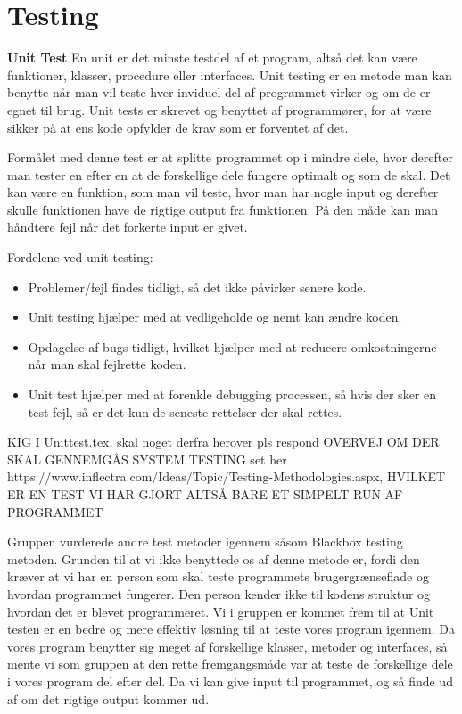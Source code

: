 \section{Testing}\label{Testing}

\textbf{Unit Test} \newline
En unit er det minste testdel af et program, altså det kan være funktioner, klasser, procedure eller interfaces. Unit testing er en metode man kan benytte når man vil teste hver inviduel del af programmet virker og om de er egnet til brug. Unit tests er skrevet og benyttet af programmører, for at være sikker på at ens kode opfylder de krav som er forventet af det. 

\vspace {5mm}

Formålet med denne test er at splitte programmet op i mindre dele, hvor derefter man tester en efter en at de forskellige dele fungere optimalt og som de skal. Det kan være en funktion, som man vil teste, hvor man har nogle input og derefter skulle funktionen have de rigtige output fra funktionen. På den måde kan man håndtere fejl når det forkerte input er givet.

Fordelene ved unit testing:
\begin{itemize}
\item Problemer/fejl findes tidligt, så det ikke påvirker senere kode.
\item Unit testing hjælper med at vedligeholde og nemt kan ændre koden.
\item Opdagelse af bugs tidligt, hvilket hjælper med at reducere omkostningerne når man skal fejlrette koden.
\item Unit test hjælper med at forenkle debugging processen, så hvis der sker en test fejl, så er det kun de seneste rettelser der skal rettes.
\end{itemize}\cite{unittestbenefits}

{\Large KIG I Unittest.tex, skal noget derfra herover pls respond}
{\Large OVERVEJ OM DER SKAL GENNEMGÅS SYSTEM TESTING set her https://www.inflectra.com/Ideas/Topic/Testing-Methodologies.aspx, HVILKET ER EN TEST VI HAR GJORT ALTSÅ BARE ET SIMPELT RUN AF PROGRAMMET}


Gruppen vurderede andre test metoder igennem såsom Blackbox testing metoden. Grunden til at vi ikke benyttede os af denne metode er, fordi den kræver at vi har en person som skal teste programmets brugergrænseflade og hvordan programmet fungerer. Den person kender ikke til kodens struktur og hvordan det er blevet programmeret. Vi i gruppen er kommet frem til at Unit testen er en bedre og mere effektiv løsning til at teste vores program igennem. Da vores program benytter sig meget af forskellige klasser, metoder og interfaces, så mente vi som gruppen at den rette fremgangsmåde var at teste de forskellige dele i vores program del efter del. Da vi kan give input til programmet, og så finde ud af om det rigtige output kommer ud.



